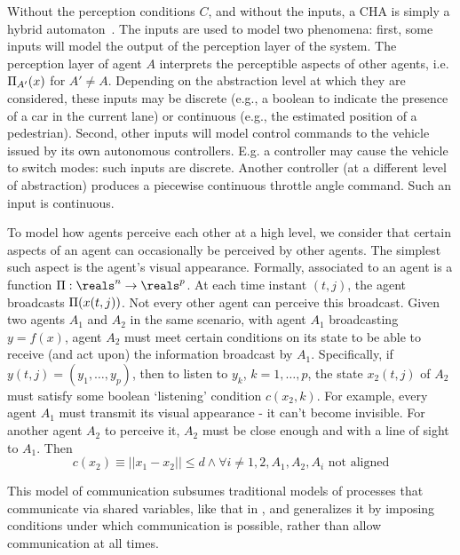 



Without the perception conditions $C$, and without the inputs, a CHA is simply a hybrid automaton~\cite{Henzinger96}.
The inputs are used to model two phenomena: 
first, some inputs will model the output of the perception layer of the system. 
The perception layer of agent $A$ interprets the perceptible aspects of other agents, i.e. $\Pi_{A'}(x)$ for $A'\neq A$.
Depending on the abstraction level at which they are considered, these inputs may be discrete (e.g., a boolean to indicate the presence of a car in the current lane) or continuous (e.g., the estimated position of a pedestrian).
Second, other inputs will model control commands to the vehicle issued by its own autonomous controllers. 
E.g. a controller may cause the vehicle to switch modes: such inputs are discrete. 
Another controller (at a different level of abstraction) produces a piecewise continuous throttle angle command. Such an input is continuous. 

To model how agents perceive each other at a high level, we consider that certain aspects of an agent can occasionally be perceived by other agents.
The simplest such aspect is the agent's visual appearance.
Formally, associated to an agent is a function $\funcOut:\reals^n \rightarrow \reals^p$.
At each time instant $(t,j)$, the agent broadcasts $\Pi(x(t,j))$.
Not every other agent can perceive this broadcast.
Given two agents $A_1$ and $A_2$ in the same scenario, with agent $A_1$ broadcasting $y = f(x)$, agent $A_2$ must meet certain conditions on its state to be able to receive (and act upon) the information broadcast by $A_1$.
Specifically, if $y(t,j) = (y_1,\ldots,y_p)$, then to listen to $y_k$, $k=1,\ldots,p$, the state $x_2(t,j)$ of $A_2$ must satisfy some boolean `listening' condition $c(x_2,k)$.
For example, every agent $A_1$ must transmit its visual appearance - it can't become invisible.
For another agent $A_2$ to perceive it, $A_2$ must be close enough and with a line of sight to $A_1$. 
Then 
\[c(x_2) \equiv ||x_1 - x_2 || \leq d \land \forall i\neq 1,2, A_1,A_2,A_i \text{ not aligned}\]

This model of communication subsumes traditional models of processes that communicate via shared variables, like that in , and generalizes it by imposing conditions under which communication is possible, rather than allow communication at all times.


